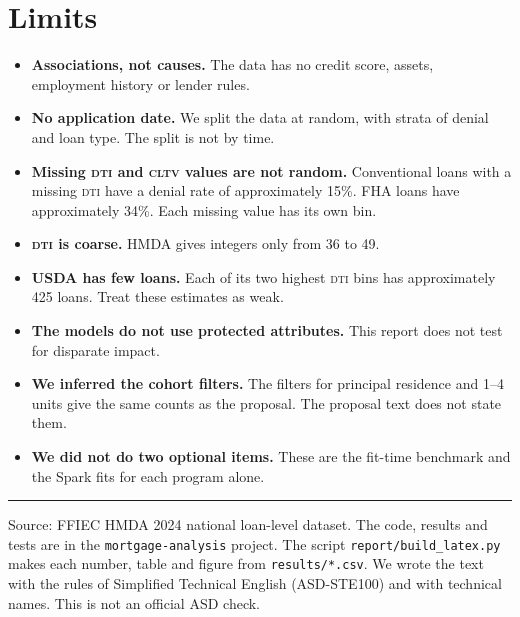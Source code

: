 \documentclass[11pt,a4paper]{article}
\newcommand{\DTI}{\textsc{dti}}
\newcommand{\CLTV}{\textsc{cltv}}
\begin{document}
\section{Limits}
\begin{itemize}
  \item \textbf{Associations, not causes.} The data has no credit score, assets, employment history or lender rules.
  \item \textbf{No application date.} We split the data at random, with strata of denial and loan type. The split is not by time.
  \item \textbf{Missing \DTI{} and \CLTV{} values are not random.} Conventional loans with a missing \DTI{} have a denial rate of approximately 15\%. FHA loans have approximately 34\%. Each missing value has its own bin.
  \item \textbf{\DTI{} is coarse.} HMDA gives integers only from 36 to 49.
  \item \textbf{USDA has few loans.} Each of its two highest \DTI{} bins has approximately 425 loans. Treat these estimates as weak.
  \item \textbf{The models do not use protected attributes.} This report does not test for disparate impact.
  \item \textbf{We inferred the cohort filters.} The filters for principal residence and 1--4 units give the same counts as the proposal. The proposal text does not state them.
  \item \textbf{We did not do two optional items.} These are the fit-time benchmark and the Spark fits for each program alone.
\end{itemize}

\vfill
\hrule\vspace{0.5em}
{\footnotesize
Source: FFIEC HMDA 2024 national loan-level dataset.
The code, results and tests are in the \texttt{mortgage-analysis} project.
The script \texttt{report/build\_latex.py} makes each number, table and figure from \texttt{results/*.csv}.
We wrote the text with the rules of Simplified Technical English (ASD-STE100) and with technical names.
This is not an official ASD check.}
\end{document}
